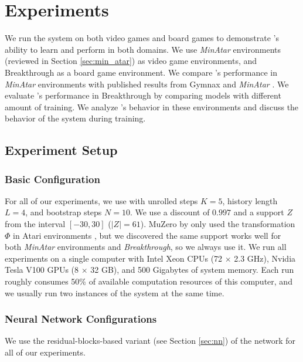 \chapter{Experiments}
\label{sec:exp}
We run the \moozi system on both video games and board games to demonstrate \moozi's ability to learn and perform in both domains.
We use \textit{MinAtar} environments (reviewed in Section \ref{sec:min_atar}) as video game environments, and Breakthrough as a board game environment.
We compare \moozi's performance in \textit{MinAtar} environments with published results from Gymnax \cite{GymnaxJAXbasedReinforcement_RobertTjarkoLange_2022} and \textit{MinAtar} \cite{MinAtarAtariInspiredTestbed_Young.Tian_2019}.
We evaluate \moozi's performance in Breakthrough by comparing \moozi models with different amount of training.
We analyze \moozi's behavior in these environments and discuss the behavior of the system during training.

\section{Experiment Setup}
\subsection{Basic Configuration}
For all of our experiments, we use \moozi with unrolled steps $K = 5$, history length $L = 4$, and bootstrap steps $N = 10$.
We use a discount of $0.997$ and a support $Z$ from the interval  $[-30, 30]$ ($|Z| = 61$).
MuZero by \citeauthor{MasteringAtariGo_Schrittwieser.Antonoglou.ea_2020} only used the transformation $\Phi$ in Atari environments \cite{MasteringAtariGo_Schrittwieser.Antonoglou.ea_2020}, but we discovered the same support works well for both \textit{MinAtar} environments and \textit{Breakthrough}, so we always use it.
We run all experiments on a single computer with Intel Xeon CPUs (72 $\times$ 2.3 GHz), Nvidia Tesla V100 GPUs (8 $\times$ 32 GB), and 500 Gigabytes of system memory.
Each run roughly consumes 50\% of available computation resources of this computer, and we usually run two instances of the system at the same time.

\subsection{Neural Network Configurations}
We use the residual-blocks-based variant (see Section \ref{sec:nn}) of the network for all of our experiments.


